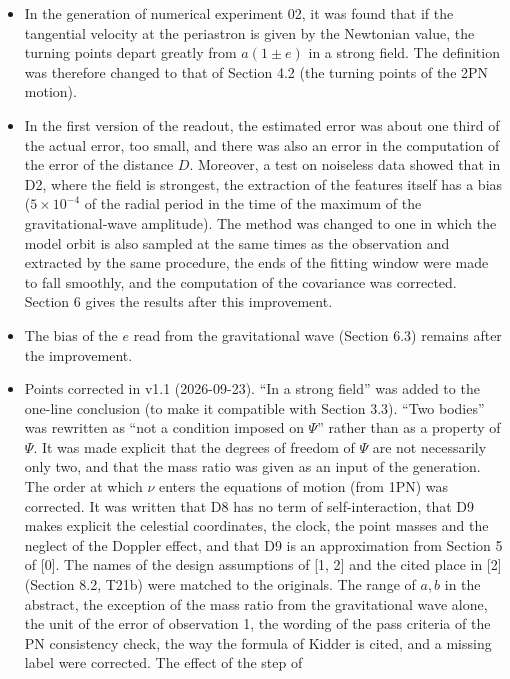 \documentclass[
  a4paper,
]{article}
\providecommand{\tightlist}{%
  \setlength{\itemsep}{0pt}\setlength{\parskip}{0pt}}
\begin{document}
\begin{itemize}
\tightlist
\item
  In the generation of numerical experiment 02, it was found that if the
  tangential velocity at the periastron is given by the Newtonian value,
  the turning points depart greatly from \(a(1\pm e)\) in a strong
  field. The definition was therefore changed to that of Section 4.2
  (the turning points of the 2PN motion).
\item
  In the first version of the readout, the estimated error was about one
  third of the actual error, too small, and there was also an error in
  the computation of the error of the distance \(D\). Moreover, a test
  on noiseless data showed that in D2, where the field is strongest, the
  extraction of the features itself has a bias (\(5\times10^{-4}\) of
  the radial period in the time of the maximum of the gravitational-wave
  amplitude). The method was changed to one in which the model orbit is
  also sampled at the same times as the observation and extracted by the
  same procedure, the ends of the fitting window were made to fall
  smoothly, and the computation of the covariance was corrected. Section
  6 gives the results after this improvement.
\item
  The bias of the \(e\) read from the gravitational wave (Section 6.3)
  remains after the improvement.
\item
  Points corrected in v1.1 (2026-09-23). ``In a strong field'' was added
  to the one-line conclusion (to make it compatible with Section 3.3).
  ``Two bodies'' was rewritten as ``not a condition imposed on
  \(\Psi\)'' rather than as a property of \(\Psi\). It was made explicit
  that the degrees of freedom of \(\Psi\) are not necessarily only two,
  and that the mass ratio was given as an input of the generation. The
  order at which \(\nu\) enters the equations of motion (from 1PN) was
  corrected. It was written that D8 has no term of self-interaction,
  that D9 makes explicit the celestial coordinates, the clock, the point
  masses and the neglect of the Doppler effect, and that D9 is an
  approximation from Section 5 of {[}0{]}. The names of the design
  assumptions of {[}1, 2{]} and the cited place in {[}2{]} (Section 8.2,
  T21b) were matched to the originals. The range of \(a, b\) in the
  abstract, the exception of the mass ratio from the gravitational wave
  alone, the unit of the error of observation 1, the wording of the pass
  criteria of the PN consistency check, the way the formula of Kidder is
  cited, and a missing label were corrected. The effect of the step of

\end{itemize}
\end{document}
